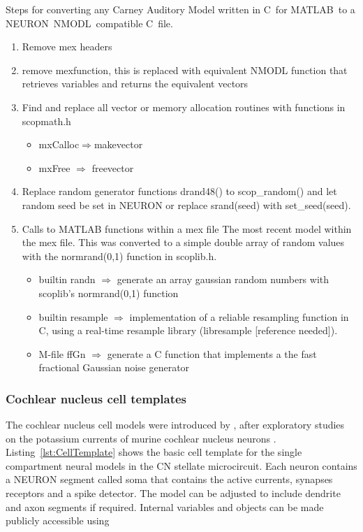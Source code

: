 Steps for converting any Carney Auditory Model written in C~for MATLAB~to a
NEURON~NMODL~compatible C~file.
\begin{enumerate}
\item Remove mex headers
\item remove \textsf{mexfunction}, this is replaced with equivalent NMODL
  function that retrieves variables and returns the equivalent vectors
\item Find and replace all vector or memory allocation routines with functions
  in scopmath.h
  \begin{itemize}
  \item \textsf{mxCalloc}$\Rightarrow$\textsf{makevector}
  \item \textsf{mxFree} $\Rightarrow$ \textsf{freevector}
  \end{itemize}
\item Replace random generator functions \textsf{drand48()} to
  \mbox{\textsf{scop\_random()}} and let random seed be set in NEURON or replace
  \textsf{srand(seed)} with \mbox{\textsf{set\_seed(seed)}}.
\item Calls to MATLAB functions within a mex file The most recent model within
  the mex file.  This was converted to a simple double array of random values
  with the \mbox{\textsf{normrand(0,1)}} function in \mbox{\textsf{scoplib.h}}.
  \begin{itemize}
  \item builtin \textsf{randn} $\Rightarrow$ generate an array gaussian random
    numbers with scoplib's \mbox{\textsf{normrand(0,1)}} function
  \item builtin \textsf{resample} $\Rightarrow$ implementation of a reliable
    resampling function in C, using a real-time resample library (libresample
    [reference needed]).
  \item M-file \textsf{ffGn} $\Rightarrow$ generate a C function that implements
    a the fast fractional Gaussian noise generator
  \end{itemize}
\end{enumerate}

\subsubsection[CN cells]{Cochlear nucleus cell templates    \label{sec:APDX:Cell_templates}}

The cochlear nucleus cell models were introduced by \citet{RothmanManis:2003b},
after exploratory studies on the potassium currents of murine cochlear nucleus
neurons \citep{RothmanManis:2003,RothmanManis:2003a}.
Listing~\ref{lst:CellTemplate} shows the basic cell template for the
single compartment neural models in the CN stellate microcircuit.  Each neuron
contains a NEURON segment called soma that contains the active currents,
synapses receptors and a spike detector. The model can be adjusted to include
dendrite and axon segments if required. Internal variables and objects can be
made publicly accessible using

